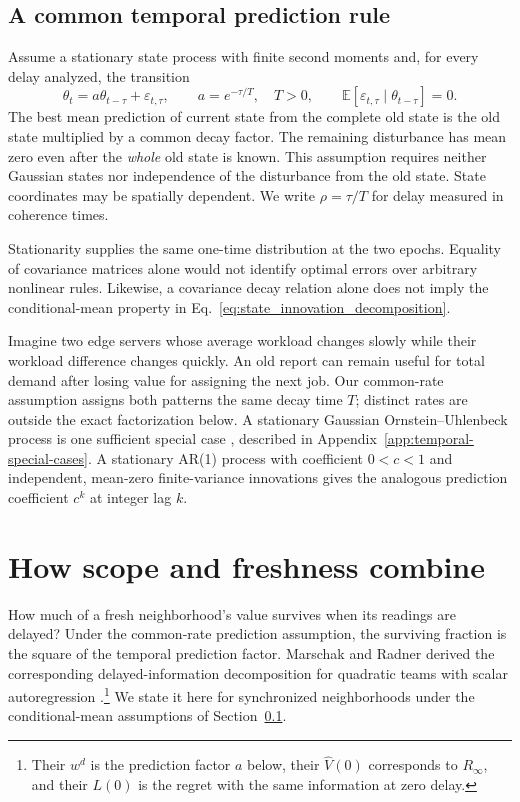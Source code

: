 \documentclass[11pt]{article}
\begin{document}
\subsection{A common temporal prediction rule}
\label{subsec:OU_model}

Assume a stationary state process with finite second moments and, for every
delay analyzed, the transition
\begin{equation}
\theta_t=a\theta_{t-\tau}+\varepsilon_{t,\tau},\qquad
a=e^{-\tau/T},\quad T>0,\qquad
\mathbb E[\varepsilon_{t,\tau}\mid\theta_{t-\tau}]=0.
\label{eq:state_innovation_decomposition}
\end{equation}
The best mean prediction of current state from the complete old state is
the old state multiplied by a common decay factor. The remaining disturbance
has mean zero even after the \emph{whole} old state is known. This assumption
requires neither Gaussian states nor independence of the disturbance from the old state.
State coordinates may be spatially dependent. We write $\rho=\tau/T$ for
delay measured in coherence times.

Stationarity supplies the same one-time distribution at the two epochs.
Equality of covariance matrices alone would not identify optimal errors
over arbitrary nonlinear rules. Likewise, a covariance decay relation alone
does not imply the conditional-mean property in
Eq.~\eqref{eq:state_innovation_decomposition}.

Imagine two edge servers whose average workload changes slowly while their
workload difference changes quickly. An old report can remain useful for
total demand after losing value for assigning the next job. Our common-rate
assumption assigns both patterns the same decay time $T$; distinct rates
are outside the exact factorization below. A stationary Gaussian
Ornstein--Uhlenbeck process is one sufficient special case
\cite{ornee2021ou}, described in Appendix~\ref{app:temporal-special-cases}.
A stationary AR(1) process with coefficient $0<c<1$ and independent,
mean-zero finite-variance innovations gives the analogous prediction
coefficient $c^k$ at integer lag $k$.

\section{How scope and freshness combine}
\label{sec:spatiotemporal_predictability}
\label{sec:fresh_local_global}

How much of a fresh neighborhood's value survives when its readings are
delayed? Under the common-rate prediction assumption, the surviving
fraction is the square of the temporal prediction factor. Marschak and
Radner derived the corresponding delayed-information decomposition for
quadratic teams with scalar autoregression
\cite[Ch.~7, Sec.~4, Eqs.~(4.21)--(4.22)]{marschak1972economic}.\footnote{Their
$w^d$ is the prediction factor $a$ below, their $\widehat V(0)$ corresponds
to $R_\infty$, and their $L(0)$ is the regret with the same information at
zero delay.}
We state it here for synchronized neighborhoods under the conditional-mean
assumptions of Section~\ref{subsec:OU_model}.
\end{document}
